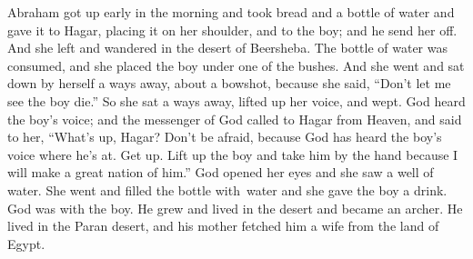 \begin{inparaenum}
   Abraham got up early in the morning and took bread and a bottle of water and gave it to Hagar, placing it on her shoulder, and to the boy; and he send her off. And she left and wandered in the desert of Beersheba.%
   The bottle of water was consumed, and she placed the boy under one of the bushes.%
   And she went and sat down by herself a ways away, about a bowshot, because she said, ``Don't let me see the boy die.'' So she sat a ways away, lifted up her voice, and wept.%
   God heard the boy's voice; and the messenger of God called to Hagar from Heaven, and said to her, ``What's up, Hagar? Don't be afraid, because God has heard the boy's voice where he's at.%
   Get up. Lift up the boy and take him by the hand because I will make a great nation of him.''%
   God opened her eyes and she saw a well of water. She went and filled the bottle with\understood\ water and she gave the boy a drink.%
   God was with the boy. He grew and lived in the desert and became an archer.%
   He lived in the Paran desert, and his mother fetched him a wife from the land of Egypt.%
  

\end{inparaenum}
